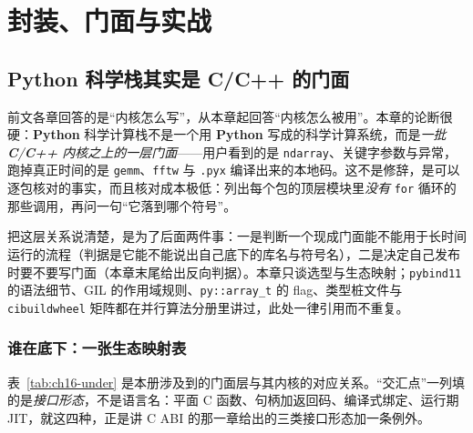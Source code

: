 \documentclass[12pt,a4paper,fontset=fandol]{ctexbook}
\newcommand{\Tp}[1]{\texttt{#1}}
\newcommand{\Bk}{\allowbreak}
\newcommand{\Lang}[1]{\textsf{\bfseries #1}}
\newcommand{\CL}{\Lang{C}}
\newcommand{\CPP}{\Lang{C++}}
\newcommand{\PY}{\Lang{Python}}
\begin{document}
\part{封装、门面与实战}

\chapter{Python 科学栈其实是 C/C++ 的门面}

前文各章回答的是``内核怎么写''，从本章起回答``内核怎么被用''。本章的论断很硬：\PY{} 科学计算栈不是一个用 \PY{} 写成的科学计算系统，而是\emph{一批 \CL/{\Bk}\CPP{} 内核之上的一层门面}——用户看到的是 \Tp{ndarray}、关键字参数与异常，跑掉真正时间的是 \Tp{gemm}、\Tp{fftw} 与 \Tp{.pyx} 编译出来的本地码。这不是修辞，是可以逐包核对的事实，而且核对成本极低：列出每个包的顶层模块里\emph{没有} \Tp{for} 循环的那些调用，再问一句``它落到哪个符号''。

把这层关系说清楚，是为了后面两件事：一是判断一个现成门面能不能用于长时间运行的流程（判据是它能不能说出自己底下的库名与符号名），二是决定自己发布时要不要写门面（本章末尾给出反向判据）。本章只谈选型与生态映射；\Tp{pybind11} 的语法细节、GIL 的作用域规则、\Tp{py::array\_t} 的 flag、类型桩文件与 \Tp{cibuildwheel} 矩阵都在并行算法分册里讲过，此处一律引用而不重复。

\section{谁在底下：一张生态映射表}

表~\ref{tab:ch16-under} 是本册涉及到的门面层与其内核的对应关系。``交汇点''一列填的是\emph{接口形态}，不是语言名：平面 C 函数、句柄加返回码、编译式绑定、运行期 JIT，就这四种，正是讲 C ABI 的那一章给出的三类接口形态加一条例外。
\end{document}
